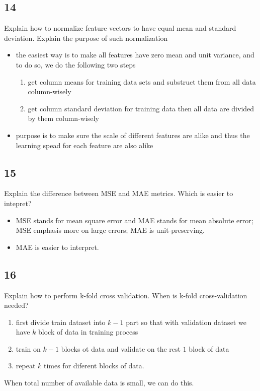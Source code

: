 \documentclass{article}
\begin{document}
\subsection*{14}
\begin{myleftlinebox}
    Explain how to normalize feature vectors to have equal mean and standard deviation. Explain the purpose of such normalization
    \tcblower
    \begin{itemize}
        \item the easiest way is to make all features have zero mean and unit variance, and to do so, we do the following two steps
        \begin{enumerate}
            \item get column means for training data sets and substruct them from all data  column-wisely
            \item get column standard deviation for training data then all data are divided by them column-wisely
        \end{enumerate}
        \item purpose is to make sure the scale of different features are alike and thus the learning spead for each feature are also alike
    \end{itemize}
\end{myleftlinebox}

\subsection*{15}
\begin{myleftlinebox}
    Explain the difference between MSE and MAE metrics. Which is easier to intepret?
    \tcblower
    \begin{itemize}
        \item MSE stands for mean square error and MAE stands for mean absolute error; MSE emphasis more on large errors; MAE is unit-preserving.
        \item MAE is easier to interpret.
    \end{itemize}
\end{myleftlinebox}

\subsection*{16}
\begin{myleftlinebox}
    Explain how to perform k-fold cross validation. When is k-fold cross-validation needed?
    \tcblower
    \begin{enumerate}
        \item first divide train dataset into \(k-1\) part so that with validation dataset we have \(k\) block of data in training process
        \item train on \(k-1\) blocks ot data and validate on the rest \(1\) block of data
        \item repeat \(k\) times for diferent blocks of data.                       
    \end{enumerate}
    When total number of available data is small, we can do this.
\end{myleftlinebox}
\end{document}
